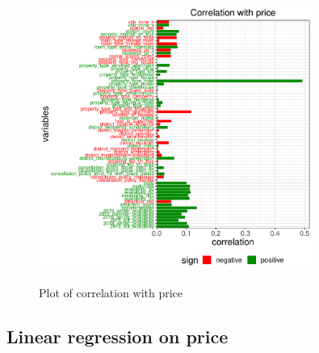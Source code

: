 \begin{figure}[H]
\begin{center}
\includegraphics[width=0.8\textwidth, keepaspectratio]{price_correlation.pdf} \\
\caption{Plot of correlation with price}
\label{figure:room_type}
\end{center}
\end{figure}



\subsection{Linear regression on price}\label{subsec:lm}


